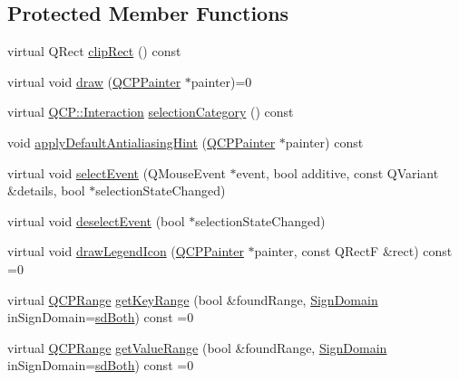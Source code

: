 \subsection*{Protected Member Functions}
\begin{DoxyCompactItemize}
\item 
virtual Q\+Rect \hyperlink{classQCPAbstractPlottable_ac01960b0827913922f5364d559c124ed}{clip\+Rect} () const 
\item 
virtual void \hyperlink{classQCPAbstractPlottable_acbab5e30dcd04fd302b4a5902ac2c482}{draw} (\hyperlink{classQCPPainter}{Q\+C\+P\+Painter} $\ast$painter)=0
\item 
virtual \hyperlink{namespaceQCP_a2ad6bb6281c7c2d593d4277b44c2b037}{Q\+C\+P\+::\+Interaction} \hyperlink{classQCPAbstractPlottable_a5eef607bcc2aee8bfe2380a8710f6c64}{selection\+Category} () const 
\item 
void \hyperlink{classQCPAbstractPlottable_a76e9d6cc7972dc1528f526d163766aca}{apply\+Default\+Antialiasing\+Hint} (\hyperlink{classQCPPainter}{Q\+C\+P\+Painter} $\ast$painter) const 
\item 
virtual void \hyperlink{classQCPAbstractPlottable_a16aaad02456aa23a759efd1ac90c79bf}{select\+Event} (Q\+Mouse\+Event $\ast$event, bool additive, const Q\+Variant \&details, bool $\ast$selection\+State\+Changed)
\item 
virtual void \hyperlink{classQCPAbstractPlottable_a6fa0d0f95560ea8b01ee13f296dab2b1}{deselect\+Event} (bool $\ast$selection\+State\+Changed)
\item 
virtual void \hyperlink{classQCPAbstractPlottable_a9a450783fd9ed539e589999fd390cdf7}{draw\+Legend\+Icon} (\hyperlink{classQCPPainter}{Q\+C\+P\+Painter} $\ast$painter, const Q\+RectF \&rect) const =0
\item 
virtual \hyperlink{classQCPRange}{Q\+C\+P\+Range} \hyperlink{classQCPAbstractPlottable_a345d702b2e7e12c8cfdddff65ba85e8c}{get\+Key\+Range} (bool \&found\+Range, \hyperlink{classQCPAbstractPlottable_a661743478a1d3c09d28ec2711d7653d8}{Sign\+Domain} in\+Sign\+Domain=\hyperlink{classQCPAbstractPlottable_a661743478a1d3c09d28ec2711d7653d8a082b98cfb91a7363a3b5cd17b0c1cd60}{sd\+Both}) const =0
\item 
virtual \hyperlink{classQCPRange}{Q\+C\+P\+Range} \hyperlink{classQCPAbstractPlottable_aa3331b415b5939fe4df60b78831b2799}{get\+Value\+Range} (bool \&found\+Range, \hyperlink{classQCPAbstractPlottable_a661743478a1d3c09d28ec2711d7653d8}{Sign\+Domain} in\+Sign\+Domain=\hyperlink{classQCPAbstractPlottable_a661743478a1d3c09d28ec2711d7653d8a082b98cfb91a7363a3b5cd17b0c1cd60}{sd\+Both}) const =0

\end{DoxyCompactItemize}
